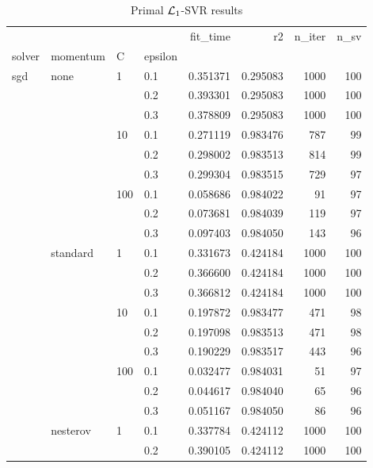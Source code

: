 \begin{table}[H]
\centering
\caption{Primal $\protect \mathcal{L}_1$-SVR results}
\label{primal_l1_svr_cv_results}
\begin{tabular}{llllrrrr}
\toprule
          &   &     &     &  fit\_time &        r2 &  n\_iter &  n\_sv \\
solver & momentum & C & epsilon &           &           &         &       \\
\midrule
sgd & none & 1   & 0.1 &  0.351371 &  0.295083 &    1000 &   100 \\
          &   &     & 0.2 &  0.393301 &  0.295083 &    1000 &   100 \\
          &   &     & 0.3 &  0.378809 &  0.295083 &    1000 &   100 \\
          &   & 10  & 0.1 &  0.271119 &  0.983476 &     787 &    99 \\
          &   &     & 0.2 &  0.298002 &  0.983513 &     814 &    99 \\
          &   &     & 0.3 &  0.299304 &  0.983515 &     729 &    97 \\
          &   & 100 & 0.1 &  0.058686 &  0.984022 &      91 &    97 \\
          &   &     & 0.2 &  0.073681 &  0.984039 &     119 &    97 \\
          &   &     & 0.3 &  0.097403 &  0.984050 &     143 &    96 \\
          & standard & 1   & 0.1 &  0.331673 &  0.424184 &    1000 &   100 \\
          &   &     & 0.2 &  0.366600 &  0.424184 &    1000 &   100 \\
          &   &     & 0.3 &  0.366812 &  0.424184 &    1000 &   100 \\
          &   & 10  & 0.1 &  0.197872 &  0.983477 &     471 &    98 \\
          &   &     & 0.2 &  0.197098 &  0.983513 &     471 &    98 \\
          &   &     & 0.3 &  0.190229 &  0.983517 &     443 &    96 \\
          &   & 100 & 0.1 &  0.032477 &  0.984031 &      51 &    97 \\
          &   &     & 0.2 &  0.044617 &  0.984040 &      65 &    96 \\
          &   &     & 0.3 &  0.051167 &  0.984050 &      86 &    96 \\
          & nesterov & 1   & 0.1 &  0.337784 &  0.424112 &    1000 &   100 \\
          &   &     & 0.2 &  0.390105 &  0.424112 &    1000 &   100 \\

\end{tabular}
\end{table}
